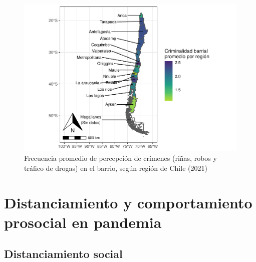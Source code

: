 \documentclass[
  12pt,
  openany]{book}
\begin{document}
\begin{figure}

{\centering \includegraphics{reporte-elsoc_files/figure-latex/confli-region-1} 

}

\caption{Frecuencia promedio de percepción de crímenes (riñas, robos y tráfico de drogas) en el barrio, según región de Chile (2021)}\label{fig:confli-region}
\end{figure}

\hypertarget{distanciamiento-y-comportamiento-prosocial-en-pandemia}{%
\chapter{Distanciamiento y comportamiento prosocial en pandemia}\label{distanciamiento-y-comportamiento-prosocial-en-pandemia}}

\hypertarget{distanciamiento-social}{%
\section{Distanciamiento social}\label{distanciamiento-social}}
\end{document}
